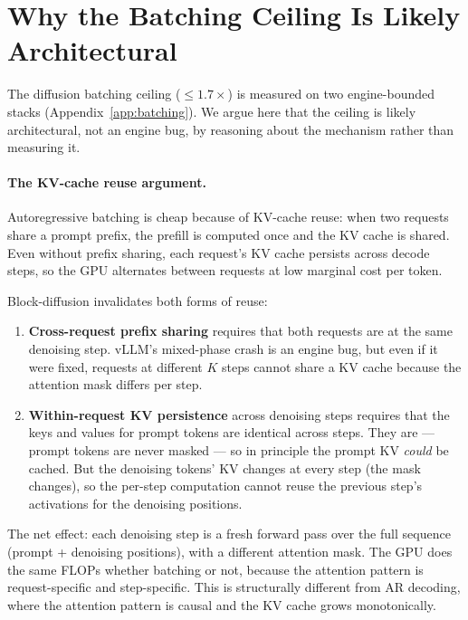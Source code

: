 \section{Why the Batching Ceiling Is Likely Architectural}
\label{app:batching_architectural}

The diffusion batching ceiling ($\leq 1.7\times$) is measured on two
engine-bounded stacks (Appendix~\ref{app:batching}). We argue here that
the ceiling is likely architectural, not an engine bug, by reasoning
about the mechanism rather than measuring it.

\paragraph{The KV-cache reuse argument.}
Autoregressive batching is cheap because of KV-cache reuse: when two
requests share a prompt prefix, the prefill is computed once and the KV
cache is shared. Even without prefix sharing, each request's KV cache
persists across decode steps, so the GPU alternates between requests at
low marginal cost per token.

Block-diffusion invalidates both forms of reuse:

\begin{enumerate}[nosep]
\item \textbf{Cross-request prefix sharing} requires that both requests
are at the same denoising step. vLLM's mixed-phase crash is an engine
bug, but even if it were fixed, requests at different $K$ steps cannot
share a KV cache because the attention mask differs per step.
\item \textbf{Within-request KV persistence} across denoising steps
requires that the keys and values for prompt tokens are identical across
steps. They are --- prompt tokens are never masked --- so in principle
the prompt KV \emph{could} be cached. But the denoising tokens' KV changes
at every step (the mask changes), so the per-step computation cannot
reuse the previous step's activations for the denoising positions.
\end{enumerate}

The net effect: each denoising step is a fresh forward pass over the full
sequence (prompt + denoising positions), with a different attention mask.
The GPU does the same FLOPs whether batching or not, because the
attention pattern is request-specific and step-specific. This is
structurally different from AR decoding, where the attention pattern is
causal and the KV cache grows monotonically.

